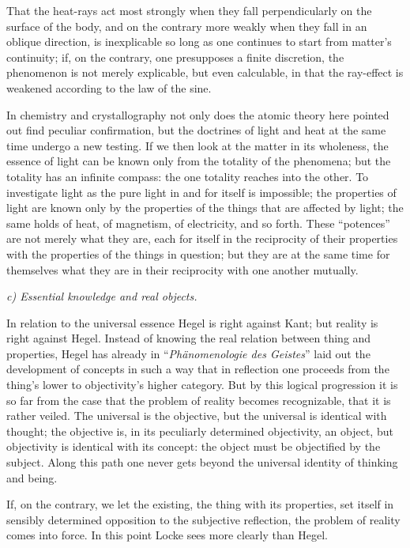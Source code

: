 \documentclass[12pt]{book}
\begin{document}
That the heat-rays act most strongly when they fall perpendicularly on the surface
of the body, and on the contrary more weakly when they fall in an oblique
direction, is inexplicable so long as one continues to start from matter's
continuity; if, on the contrary, one presupposes a finite discretion, the
phenomenon is not merely explicable, but even calculable, in that the ray-effect is
weakened according to the law of the sine.

In chemistry and crystallography not only does the atomic theory here pointed out
find peculiar confirmation, but the doctrines of light and heat at the same time
undergo a new testing. If we then look at the matter in its wholeness, the essence
of light can be known only from the totality of the phenomena; but the totality has
an infinite compass: the one totality reaches into the other. To investigate light
as the pure light in and for itself is impossible; the properties of light are known
only by the properties of the things that are affected by light; the same holds of
heat, of magnetism, of electricity, and so forth. These ``potences'' are not merely
what they are, each for itself in the reciprocity of their properties with the
properties of the things in question;
but they are at the same time for themselves what they are in their reciprocity with
one another mutually.

\emph{c) Essential knowledge and real objects.}

In relation to the universal essence Hegel is right against Kant; but reality is
right against Hegel. Instead of knowing the real relation between thing and
properties, Hegel has already in ``\textit{Phänomenologie des Geistes}'' laid out the
development of concepts in such a way that in reflection one proceeds from the thing's
lower to objectivity's higher category. But by this logical progression it is so far
from the case that the problem of reality becomes recognizable, that it is rather
veiled. The universal is the objective, but the universal is identical with thought;
the objective is, in its peculiarly determined objectivity, an object, but
objectivity is identical with its concept: the object must be objectified by the
subject. Along this path one never gets beyond the universal identity of thinking and
being.

If, on the contrary, we let the existing, the thing with its properties, set itself
in sensibly determined opposition to the subjective reflection, the problem of
reality comes into force. In this point Locke sees more clearly than Hegel.
\end{document}
